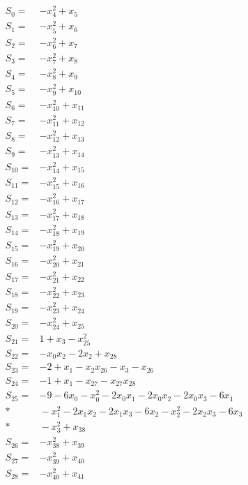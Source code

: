 \begingroup\small
\allowdisplaybreaks[4]
\setlength{\jot}{2pt}
\begin{align*}
S_{0}={}&-x_{4}^{2}+x_{5}\\[3pt]
S_{1}={}&-x_{5}^{2}+x_{6}\\[3pt]
S_{2}={}&-x_{6}^{2}+x_{7}\\[3pt]
S_{3}={}&-x_{7}^{2}+x_{8}\\[3pt]
S_{4}={}&-x_{8}^{2}+x_{9}\\[3pt]
S_{5}={}&-x_{9}^{2}+x_{10}\\[3pt]
S_{6}={}&-x_{10}^{2}+x_{11}\\[3pt]
S_{7}={}&-x_{11}^{2}+x_{12}\\[3pt]
S_{8}={}&-x_{12}^{2}+x_{13}\\[3pt]
S_{9}={}&-x_{13}^{2}+x_{14}\\[3pt]
S_{10}={}&-x_{14}^{2}+x_{15}\\[3pt]
S_{11}={}&-x_{15}^{2}+x_{16}\\[3pt]
S_{12}={}&-x_{16}^{2}+x_{17}\\[3pt]
S_{13}={}&-x_{17}^{2}+x_{18}\\[3pt]
S_{14}={}&-x_{18}^{2}+x_{19}\\[3pt]
S_{15}={}&-x_{19}^{2}+x_{20}\\[3pt]
S_{16}={}&-x_{20}^{2}+x_{21}\\[3pt]
S_{17}={}&-x_{21}^{2}+x_{22}\\[3pt]
S_{18}={}&-x_{22}^{2}+x_{23}\\[3pt]
S_{19}={}&-x_{23}^{2}+x_{24}\\[3pt]
S_{20}={}&-x_{24}^{2}+x_{25}\\[3pt]
S_{21}={}&1+x_{3}-x_{25}^{2}\\[3pt]
S_{22}={}&-x_{0}x_{2}-2x_{2}+x_{28}\\[3pt]
S_{23}={}&-2+x_{1}-x_{2}x_{26}-x_{3}-x_{26}\\[3pt]
S_{24}={}&-1+x_{1}-x_{27}-x_{27}x_{28}\\[3pt]
S_{25}={}&-9-6x_{0}-x_{0}^{2}-2x_{0}x_{1}-2x_{0}x_{2}-2x_{0}x_{3}-6x_{1}\\*
&{}-x_{1}^{2}-2x_{1}x_{2}-2x_{1}x_{3}-6x_{2}-x_{2}^{2}-2x_{2}x_{3}-6x_{3}\\*
&{}-x_{3}^{2}+x_{38}\\[3pt]
S_{26}={}&-x_{38}^{2}+x_{39}\\[3pt]
S_{27}={}&-x_{39}^{2}+x_{40}\\[3pt]
S_{28}={}&-x_{40}^{2}+x_{41}\\[3pt]

\end{align*}
